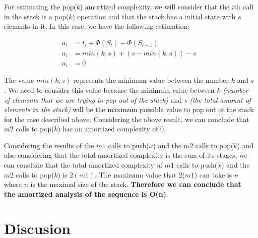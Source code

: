 \documentclass[12p]{report}
\begin{document}
For estimating the pop($k$) amortized complexity, we will consider that the $i$th call in the stack is a pop($k$) operation and that the stack has a initial state with $s$ elements in it. In this case, we have the following estimation:

\Large
\begin{align}
\nonumber
a_{i} &= t_{i} + \Phi(S_{i}) - \Phi(S_{i-1}) \\
\nonumber
a_{i} &= min(k,s) + (s- min(k,s)) - s \\
\nonumber
a_{i} &= 0
\end{align}

\large
The value $min(k,s)$ represents the minimum value between the number $k$ and $s$. We need to consider this value because the minimum value between $k$ \textit{(number of elements that we are trying to pop out of the stack)} and $s$ \textit{(the total amount of elements in the stack)} will be the maximum possible value to pop out of the stack for the case described above. Considering the above result, we can conclude that $m2$ calls to pop($k$) has an amortized complexity of 0. 

\bigskip

Considering the results of the $m1$ calls to push($x$) and the $m2$ calls to pop($k$) and also considering that the total amortized complexity is the sum of its stages, we can conclude that the total amortized complexity of $m1$ calls to push($x$) and the $m2$ calls to pop($k$) is $2(m1)$. The maximum value that 2($m1$) can take is $n$ where $n$ is the maximal size of the stack. \textbf{Therefore we can conclude that the amortized analysis of the sequence is O(n)}.


 
  \section{Discusion}			%
\end{document}

